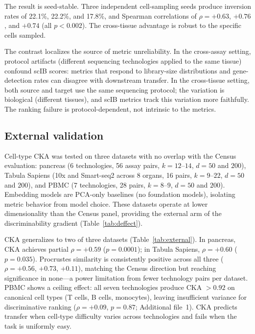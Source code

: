 \documentclass[11pt]{article}
\begin{document}
The result is seed-stable. Three independent cell-sampling seeds produce
inversion rates of 22.1\%, 22.2\%, and 17.8\%, and Spearman
correlations of $\rho = +0.63$, $+0.76$, and $+0.74$ (all
$p < 0.002$). The cross-tissue advantage is robust to the specific
cells sampled.

The contrast localizes the source of metric unreliability. In the
cross-assay setting, protocol artifacts (different sequencing
technologies applied to the same tissue) confound scIB scores: metrics
that respond to library-size distributions and gene-detection rates
can disagree with downstream transfer. In the cross-tissue setting, both
source and target use the same sequencing protocol; the variation is
biological (different tissues), and scIB metrics track this variation
more faithfully. The ranking failure is protocol-dependent, not
intrinsic to the metrics.


\subsection{External validation}
\label{sec:external}

Cell-type CKA was tested on three datasets with no overlap with the
Census evaluation: pancreas \citep{luecken2022scib} (6 technologies, 56
assay pairs, $k = 12$--$14$, $d = 50$ and $200$), Tabula Sapiens
\citep{tabulasapiens2022} (10x and Smart-seq2 across 8 organs, 16
pairs, $k = 9$--$22$, $d = 50$ and $200$), and PBMC
\citep{ding2020systematic} (7 technologies, 28 pairs, $k = 8$--$9$,
$d = 50$ and $200$). Embedding models are PCA-only baselines (no
foundation models), isolating metric behavior from model choice. These
datasets operate at lower dimensionality than the Census panel,
providing the external arm of the discriminability gradient
(Table~\ref{tab:deffect}).

CKA generalizes to two of three datasets
(Table~\ref{tab:external}). In pancreas, CKA achieves partial
$\rho = +0.59$ ($p = 0.0001$); in Tabula Sapiens, $\rho = +0.60$
($p = 0.035$). Procrustes similarity is consistently positive across all
three ($\rho = +0.56$, $+0.73$, $+0.11$), matching the Census direction
but reaching significance in none---a power limitation from fewer
technology pairs per dataset. PBMC shows a ceiling effect: all seven
technologies produce CKA $> 0.92$ on canonical cell types (T cells, B
cells, monocytes), leaving insufficient variance for discriminative
ranking ($\rho = +0.09$, $p = 0.87$; Additional file~1). CKA
predicts transfer when cell-type difficulty varies across technologies
and fails when the task is uniformly easy.
\end{document}
